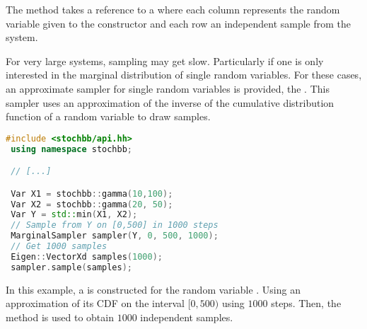 The  method takes a reference to a  where each column
represents the random variable given to the constructor and each row an independent sample from
the system.

For very large systems, sampling may get slow. Particularly if one is only interested
in the marginal distribution of single random variables. For these cases, an approximate sampler
for single random variables is provided, the . This sampler uses an
approximation of the inverse of the cumulative distribution function of a random variable
to draw samples.
\begin{lstlisting}[language=C++]
 #include <stochbb/api.hh>
 using namespace stochbb;

 // [...]

 Var X1 = stochbb::gamma(10,100);
 Var X2 = stochbb::gamma(20, 50);
 Var Y = std::min(X1, X2);
 // Sample from Y on [0,500] in 1000 steps
 MarginalSampler sampler(Y, 0, 500, 1000);
 // Get 1000 samples
 Eigen::VectorXd samples(1000);
 sampler.sample(samples);
\end{lstlisting}

In this example, a  is constructed for the random variable . Using an
approximation of its CDF on the interval $[0,500)$ using $1000$ steps. Then, the
 method is used to obtain $1000$ independent samples.



